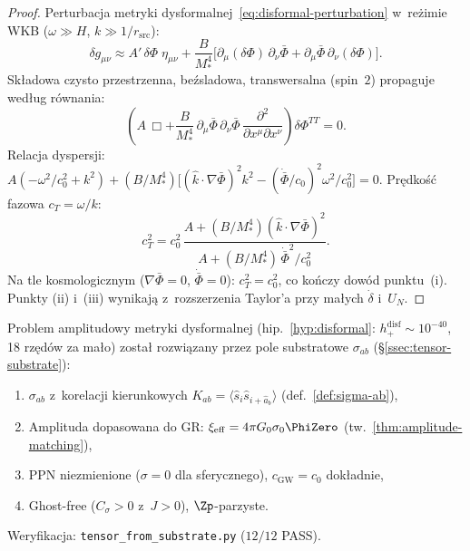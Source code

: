 \begin{proof}
Perturbacja metryki dysformalnej~\eqref{eq:disformal-perturbation}
w~re\.zimie WKB ($\omega \gg H$, $k \gg 1/r_{\mathrm{src}}$):
\[
  \delta g_{\mu\nu}
  \approx A'\,\delta\Phi\;\eta_{\mu\nu}
  + \frac{B}{M_*^4}\bigl[
    \partial_\mu(\delta\Phi)\,\partial_\nu\bar\Phi
  + \partial_\mu\bar\Phi\,\partial_\nu(\delta\Phi)\bigr].
\]
Sk\l{}adowa czysto przestrzenna, be\'zsladowa, transwersalna
(spin~$2$) propaguje wed\l{}ug r\'ownania:
\[
  \left(A\,\Box + \frac{B}{M_*^4}\,
  \partial_\mu\bar\Phi\,\partial_\nu\bar\Phi\,
  \frac{\partial^2}{\partial x^\mu\partial x^\nu}
  \right)\!\delta\Phi^{TT} = 0.
\]
Relacja dyspersji: $A(-\omega^2/c_0^2 + k^2)
+ (B/M_*^4)\bigl[(\hat k \cdot \nabla\bar\Phi)^2 k^2
- (\dot{\bar\Phi}/c_0)^2\omega^2/c_0^2\bigr] = 0$.
Pr\k{e}dko\'s\'c fazowa $c_T = \omega/k$:
\[
  c_T^2 = c_0^2\,\frac{A + (B/M_*^4)(\hat k \cdot \nabla\bar\Phi)^2}
  {A + (B/M_*^4)\,\dot{\bar\Phi}^2/c_0^2}.
\]
Na tle kosmologicznym ($\nabla\bar\Phi = 0$, $\dot{\bar\Phi} = 0$):
$c_T^2 = c_0^2$, co ko\'nczy dow\'od punktu~(i).
Punkty (ii) i~(iii) wynikaj\k{a} z~rozszerzenia
Taylor'a przy ma\l{}ych $\dot\delta$ i~$U_N$.
\end{proof}

\begin{problem}\label{prob:tensor-modes}
Problem amplitudowy metryki dysformalnej
(hip.~\ref{hyp:disformal}: $h_+^{\mathrm{disf}}
\sim 10^{-40}$, 18 rz\k{e}d\'ow za ma\l{}o)
zosta\l{} rozwi\k{a}zany przez pole substratowe $\sigma_{ab}$
(\S\ref{ssec:tensor-substrate}):
\begin{enumerate}[nosep]
  \item[\checkmark] $\sigma_{ab}$ z~korelacji kierunkowych
    $K_{ab} = \langle\hat{s}_i\hat{s}_{i+\hat{a}_b}\rangle$
    (def.~\ref{def:sigma-ab}),
  \item[\checkmark] Amplituda dopasowana do GR:
    $\xi_{\mathrm{eff}} = 4\pi G_0\sigma_0\PhiZero$
    (tw.~\ref{thm:amplitude-matching}),
  \item[\checkmark] PPN niezmienione ($\sigma = 0$ dla sferycznego),
    $c_{\mathrm{GW}} = c_0$ dok\l{}adnie,
  \item[\checkmark] Ghost-free ($C_\sigma > 0$ z~$J > 0$),
    $\Zp$-parzyste.
\end{enumerate}
Weryfikacja: \texttt{tensor\_from\_substrate.py} ($12/12$ PASS).
\end{problem}

